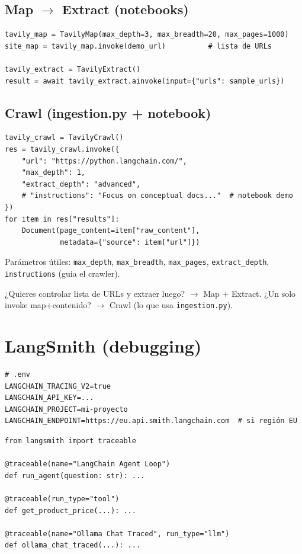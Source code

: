\documentclass[11pt,a4paper]{article}
\begin{document}
\subsection{Map $\to$ Extract (notebooks)}
\begin{lstlisting}
tavily_map = TavilyMap(max_depth=3, max_breadth=20, max_pages=1000)
site_map = tavily_map.invoke(demo_url)          # lista de URLs

tavily_extract = TavilyExtract()
result = await tavily_extract.ainvoke(input={"urls": sample_urls})
\end{lstlisting}

\subsection{Crawl (ingestion.py + notebook)}
\begin{lstlisting}
tavily_crawl = TavilyCrawl()
res = tavily_crawl.invoke({
    "url": "https://python.langchain.com/",
    "max_depth": 1,
    "extract_depth": "advanced",
    # "instructions": "Focus on conceptual docs..."  # notebook demo
})
for item in res["results"]:
    Document(page_content=item["raw_content"],
             metadata={"source": item["url"]})
\end{lstlisting}

Parámetros útiles: \texttt{max\_depth}, \texttt{max\_breadth}, \texttt{max\_pages}, \texttt{extract\_depth}, \texttt{instructions} (guia el crawler).

\begin{lookup}[title=¿Map+Extract o Crawl?]
¿Quieres controlar lista de URLs y extraer luego? $\to$ Map + Extract.
¿Un solo invoke map+contenido? $\to$ Crawl (lo que usa \texttt{ingestion.py}).
\end{lookup}

\section{LangSmith (debugging)}

\begin{lstlisting}
# .env
LANGCHAIN_TRACING_V2=true
LANGCHAIN_API_KEY=...
LANGCHAIN_PROJECT=mi-proyecto
LANGCHAIN_ENDPOINT=https://eu.api.smith.langchain.com  # si región EU
\end{lstlisting}

\begin{lstlisting}
from langsmith import traceable

@traceable(name="LangChain Agent Loop")
def run_agent(question: str): ...

@traceable(run_type="tool")
def get_product_price(...): ...

@traceable(name="Ollama Chat Traced", run_type="llm")
def ollama_chat_traced(...): ...
\end{lstlisting}
\end{document}
